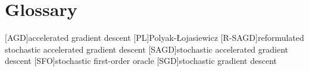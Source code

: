 
\chapter{Glossary}

\begin{acronym}[R-SAGD]
  [AGD]{accelerated gradient descent}
  [PL]{Polyak-Łojasiewicz} 
  [R-SAGD]{reformulated stochastic accelerated gradient descent}
  [SAGD]{stochastic accelerated gradient descent}
  [SFO]{stochastic first-order oracle}
  [SGD]{stochastic gradient descent}
\end{acronym}
